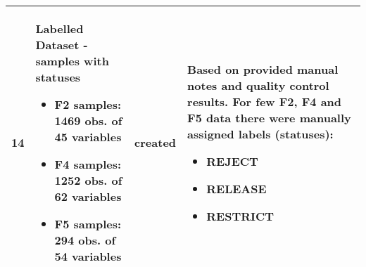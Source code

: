 \begin{landscape}
\begin{center}
\begin{longtable}{l | p{5cm} | p{1.5cm} | p{10cm}}
14&	Labelled Dataset - samples with statuses 
\begin{itemize}
    \item F2 samples: 1469 obs. of 45 variables
    \item F4 samples: 1252 obs. of 62 variables
    \item F5 samples: 294 obs. of 54 variables
\end{itemize}
&created& 	
Based on provided manual notes and quality control results.  
For few F2, F4 and F5 data there were manually assigned labels (statuses): \begin{itemize}
    \item REJECT
    \item RELEASE
    \item RESTRICT
\end{itemize}
\\
\hline
\end{longtable}
\end{center}
\end{landscape}

